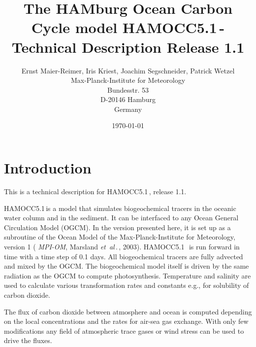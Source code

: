 \documentclass[11pt,a4paper,fleqn,twoside]{article}
\newcommand{\etal}{{\em et~al\,}.\,}
\newcommand{\ham}{HAMOCC5.1\,}
\begin{document}

\title{The {\bf HAM}burg {\bf O}cean {\bf C}arbon {\bf C}ycle model \ham - 
                 Technical Description Release 1.1}

\author{Ernst Maier-Reimer, Iris Kriest, Joachim Segschneider, Patrick Wetzel\\
Max-Planck-Institute for Meteorology\\Bundesstr. 53\\ D-20146 Hamburg\\ Germany}
\date{\today}



\newpage

\tableofcontents{}

\newpage

\section{Introduction}

This is a technical description for \ham, release 1.1.

\ham is a model that simulates biogeochemical tracers in the oceanic water
column and in the sediment. It can be interfaced to any Ocean General Circulation
Model (OGCM). In the version presented here, it is set up as a subroutine of the
Ocean Model of the Max-Planck-Institute for Meteorology, version 1 ({\em
MPI-OM}, Marsland \etal, 2003\nocite{marsland:2003}). \ham\ is run forward in
time with a time step of 0.1 days. All biogeochemical tracers are fully
advected and mixed by the OGCM. The biogeochemical model itself is driven by
the same radiation as the OGCM to compute photosynthesis. Temperature and salinity 
are used to calculate various transformation rates and constants e.g., for solubility 
of carbon dioxide. 

The flux of carbon dioxide between atmosphere and ocean is computed 
depending on the local concentrations and the rates for  air-sea gas exchange. 
With only few modifications any field of atmospheric trace gases or wind stress 
can be used to drive the fluxes.
\end{document}
